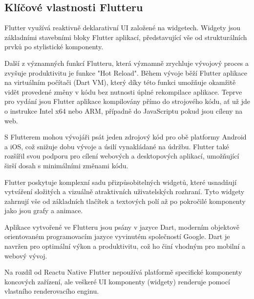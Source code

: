 \subsection*{Klíčové vlastnosti Flutteru}

Flutter využívá reaktivně deklarativní UI založené na widgetech. \cite{flutterUI} Widgety jsou základními stavebními 
bloky Flutter aplikací, představující vše od strukturálních prvků po stylistické komponenty. \cite{flutterWidgets}

Další z významných funkcí Flutteru, která významně zrychluje vývojový proces a zvyšuje produktivitu je funkce "Hot Reload". 
Během vývoje běží Flutter aplikace na virtuálním počítači (Dart VM), který díky této funkci umožňuje okamžitě vidět provedené změny
v kódu bez nutnosti úplné rekompilace aplikace. \cite{flutterHotReload} Teprve pro vydání jsou Flutter aplikace kompilovány přímo do strojového kódu, 
ať už jde o instrukce Intel x64 nebo ARM, případně do JavaScriptu pokud jsou cíleny na web. \cite{flutterArchOverview}


S Flutterem mohou vývojáři psát jeden zdrojový kód pro obě platformy Android a iOS, což snižuje dobu vývoje a úsilí 
vynakládané na údržbu. Flutter také rozšířil svou podporu pro cílení webových a desktopových aplikací, umožňující širší dosah s minimálními změnami kódu. \cite{flutter}

Flutter poskytuje komplexní sadu přizpůsobitelných widgetů, které usnadňují vytváření složitých a vizuálně 
atraktivních uživatelských rozhraní. Tyto widgety zahrnují vše od základních tlačítek a textových polí až po 
pokročilé komponenty jako jsou grafy a animace.

Aplikace vytvořené ve Flutteru jsou psány v jazyce Dart, moderním objektově orientovaném programovacím jazyce 
vyvinutém společností Google. Dart je navržen pro optimální výkon a produktivitu, což ho činí vhodným pro mobilní a
webový vývoj. \cite{dart}

Na rozdíl od Reactu Native Flutter nepoužívá platformě specifické komponenty koncových zařízení, ale veškeré UI komponenty (widgety)
renderuje pomocí vlastního renderovacího enginu. \cite{flutterRenderingModel}


